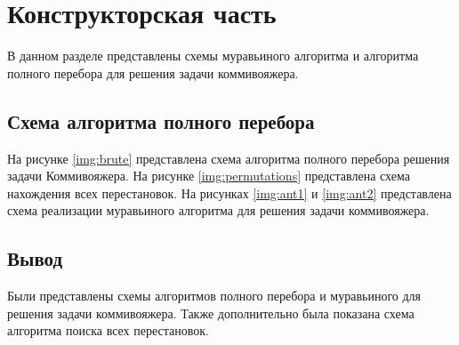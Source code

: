 \chapter{Конструкторская часть}

В данном разделе представлены схемы муравьиного алгоритма и алгоритма полного перебора для решения задачи коммивояжера.

\section{Схема алгоритма полного перебора}

На рисунке \ref{img:brute} представлена схема алгоритма полного перебора решения задачи Коммивояжера. На рисунке \ref{img:permutations} представлена схема нахождения всех перестановок. На рисунках \ref{img:ant1} и \ref{img:ant2} представлена схема реализации муравьиного алгоритма для решения задачи коммивояжера.

\clearpage
{}
\clearpage
{}
\clearpage
{}
\clearpage
{}
\clearpage

\section*{Вывод}
Были представлены схемы алгоритмов полного перебора и муравьиного для решения задачи коммивояжера. Также дополнительно была показана схема алгоритма поиска всех перестановок.
